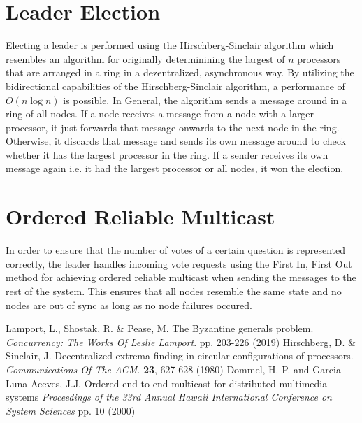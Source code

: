 \documentclass[runningheads]{llncs}
\begin{document}
\section{Leader Election}

Electing a leader is performed using the Hirschberg-Sinclair algorithm which resembles an algorithm for originally determinining the largest of $n$ processors that are arranged in a ring in a dezentralized, asynchronous way.
By utilizing the bidirectional capabilities of the Hirschberg-Sinclair algorithm, a performance of $O(n\log{}n)$ is possible.\cite{hirschberg1980decentralized}
In General, the algorithm sends a message around in a ring of all nodes.
If a node receives a message from a node with a larger processor, it just forwards that message onwards to the next node in the ring.
Otherwise, it discards that message and sends its own message around to check whether it has the largest processor in the ring.
If a sender receives its own message again i.e. it had the largest processor or all nodes, it won the election.

\section{Ordered Reliable Multicast}

In order to ensure that the number of votes of a certain question is represented correctly,
the leader handles incoming vote requests using the First In, First Out method for achieving ordered reliable multicast when sending the messages to the rest of the system.\cite{dommel2000orderedmulticast}
This ensures that all nodes resemble the same state and no nodes are out of sync as long as no node failures occured.


\begin{thebibliography}{8}
Lamport, L., Shostak, R. \& Pease, M. The Byzantine generals problem. {\em Concurrency: The Works Of Leslie Lamport}. pp. 203-226 (2019)
Hirschberg, D. \& Sinclair, J. Decentralized extrema-finding in circular configurations of processors. {\em Communications Of The ACM}. \textbf{23}, 627-628 (1980)
Dommel, H.-P. and Garcia-Luna-Aceves, J.J. Ordered end-to-end multicast for distributed multimedia systems {\em Proceedings of the 33rd Annual Hawaii International Conference on System Sciences} pp. 10 (2000)
\end{thebibliography}
\end{document}
